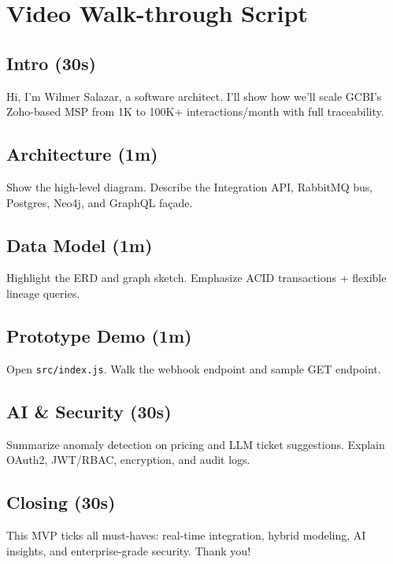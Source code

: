 \section{Video Walk-through Script}

\subsection*{Intro (30s)}
Hi, I'm Wilmer Salazar, a software architect. I'll show how we'll scale GCBI's Zoho-based MSP from 1K to 100K+ interactions/month with full traceability.

\subsection*{Architecture (1m)}
Show the high-level diagram. Describe the Integration API, RabbitMQ bus, Postgres, Neo4j, and GraphQL façade.

\subsection*{Data Model (1m)}
Highlight the ERD and graph sketch. Emphasize ACID transactions + flexible lineage queries.

\subsection*{Prototype Demo (1m)}
Open \texttt{src/index.js}. Walk the webhook endpoint and sample GET endpoint.

\subsection*{AI \& Security (30s)}
Summarize anomaly detection on pricing and LLM ticket suggestions. Explain OAuth2, JWT/RBAC, encryption, and audit logs.

\subsection*{Closing (30s)}
This MVP ticks all must-haves: real-time integration, hybrid modeling, AI insights, and enterprise-grade security. Thank you! 